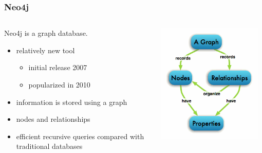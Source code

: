 \documentclass{beamer}
\begin{document}
\begin{frame}
	\frametitle{Neo4j}
	
	
	
\begin{columns} 
\begin{column}{0.60 \textwidth}
Neo4j is a graph database.
		\begin{itemize}
		\item relatively new tool
			\begin{itemize}
			\item initial release 2007
			\item popularized in 2010
			\end{itemize}
		\item information is stored using a graph
		\item nodes and relationships
		\item efficient recursive queries compared with traditional databases
		\end{itemize}
		\end{column}
		\begin{column}{0.40\textwidth}
   \includegraphics[width=0.95\textwidth]{graphdb-neo4j.png}
       \\
  \end{column}
  \end{columns}

\end{frame}
\end{document}
